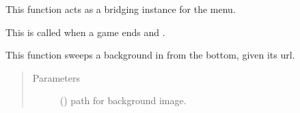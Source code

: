 \documentclass[letterpaper,10pt,english,openany,oneside]{sphinxmanual}
\begin{document}

\begin{fulllineitems}
\label{\detokenize{index:interface.start_transition}}
This function acts as a bridging instance for the menu.

This is called when a game ends and .

\end{fulllineitems}


\begin{fulllineitems}
\label{\detokenize{index:interface.swipe}}
This function sweeps a background in from the bottom, given its url.
\begin{quote}\begin{description}
\item[{Parameters}] \leavevmode
{} () \textendash{} path for background image.

\end{description}\end{quote}

\end{fulllineitems}

\end{document}

